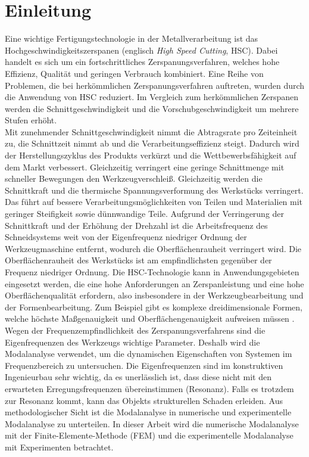 	\pagestyle{fancy}
	\section{Einleitung}\label{sec:einleitung}
	Eine wichtige Fertigungstechnologie in der Metallverarbeitung ist das Hochgeschwindigkeitszerspanen (englisch \textit{High Speed Cutting}, HSC). Dabei handelt es sich um ein fortschrittliches Zerspanungsverfahren, welches hohe Effizienz, Qualität und geringen Verbrauch kombiniert. Eine Reihe von Problemen, die bei herkömmlichen Zerspanungsverfahren auftreten, wurden durch die Anwendung von HSC reduziert. Im Vergleich zum herkömmlichen Zerspanen werden die Schnittgeschwindigkeit und die Vorschubgeschwindigkeit um mehrere Stufen erhöht.\\
	
	Mit zunehmender Schnittgeschwindigkeit nimmt die Abtragsrate pro Zeiteinheit zu, die Schnittzeit nimmt ab und die Verarbeitungseffizienz steigt. Dadurch wird der Herstellungszyklus des Produkts verkürzt und die Wettbewerbsfähigkeit auf dem Markt verbessert. Gleichzeitig verringert eine geringe Schnittmenge mit schneller Bewegungen den Werkzeugverschleiß. Gleichzeitig werden die Schnittkraft und die thermische Spannungsverformung des Werkstücks verringert. Das führt auf bessere Verarbeitungsmöglichkeiten von Teilen und Materialien mit geringer Steifigkeit sowie dünnwandige Teile. Aufgrund der Verringerung der Schnittkraft und der Erhöhung der Drehzahl ist die Arbeitsfrequenz des Schneidsystems weit von der Eigenfrequenz niedriger Ordnung der Werkzeugmaschine entfernt, wodurch die Oberflächenrauheit verringert wird. Die Oberflächenrauheit des Werkstücks ist am empfindlichsten gegenüber der Frequenz niedriger Ordnung. Die HSC-Technologie kann in Anwendungsgebieten eingesetzt werden, die eine hohe Anforderungen an Zerspanleistung und eine hohe Oberflächenqualität erfordern, also insbesondere in der Werkzeugbearbeitung und der Formenbearbeitung. Zum Beispiel gibt es komplexe dreidimensionale Formen, welche höchste Maßgenauigkeit und Oberflächengenauigkeit aufweisen müssen \cite{huseynov2015entwicklung}. \\
	
	Wegen der Frequenzempfindlichkeit des Zerspanungsverfahrens sind die Eigenfrequenzen des Werkzeugs wichtige Parameter. Deshalb wird die Modalanalyse verwendet, um die dynamischen Eigenschaften von Systemen im Frequenzbereich zu untersuchen. Die Eigenfrequenzen sind im konstruktiven Ingenieurbau sehr wichtig, da es unerlässlich ist, dass diese nicht mit den erwarteten Erregungsfrequenzen übereinstimmen (Resonanz). Falls es trotzdem zur Resonanz kommt, kann das Objekts strukturellen Schaden erleiden. Aus methodologischer Sicht ist die Modalanalyse in numerische und experimentelle Modalanalyse zu unterteilen. In dieser Arbeit wird die numerische Modalanalyse mit der Finite-Elemente-Methode (FEM) und die experimentelle Modalanalyse mit Experimenten betrachtet.\\
	
